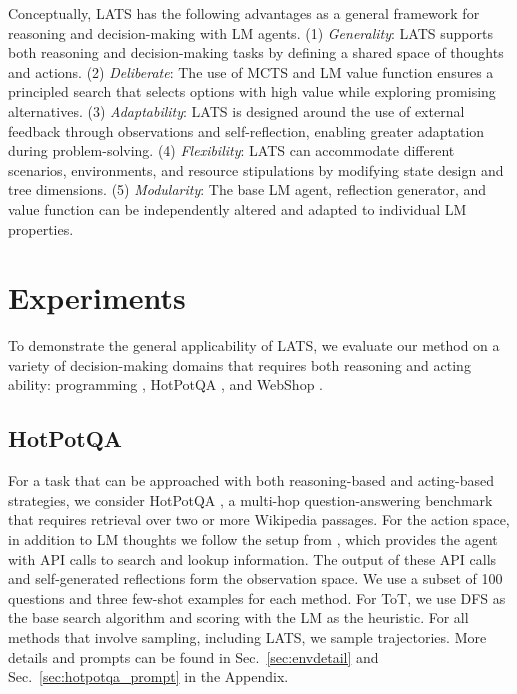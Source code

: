 \documentclass{article} \usepackage{iclr2024_conference,times}
\begin{document}
Conceptually, LATS has the following advantages as a general framework for reasoning and decision-making with LM agents.
(1) \textit{Generality}: LATS supports both reasoning and decision-making tasks by defining a shared space of thoughts and actions. (2) \textit{Deliberate}: The use of MCTS and LM value function ensures a principled search that selects options with high value while exploring promising alternatives. (3) \textit{Adaptability}: LATS is designed around the use of external feedback through observations and self-reflection, enabling greater adaptation during problem-solving. (4) \textit{Flexibility}: LATS can accommodate different scenarios, environments, and resource stipulations by modifying state design and tree dimensions. (5) \textit{Modularity}: The base LM agent, reflection generator, and value function can be independently altered and adapted to individual LM properties.

\section{Experiments}

To demonstrate the general applicability of LATS, we evaluate our method on a variety of decision-making domains that requires both reasoning and acting ability: programming \citep{chen2021evaluating, austin2021program}, HotPotQA \citep{yang2018hotpotqa}, and WebShop \citep{yao2022webshop}.

\subsection{HotPotQA}

For a task that can be approached with both reasoning-based and acting-based strategies, we consider HotPotQA \citep{yang2018hotpotqa}, a multi-hop question-answering benchmark that requires retrieval over two or more Wikipedia passages. For the action space, in addition to LM thoughts we follow the setup from \citet{yao2023react}, which provides the agent with API calls to search and lookup information. The output of these API calls and self-generated reflections form the observation space. We use a subset of 100 questions and three few-shot examples for each method. For ToT, we use DFS as the base search algorithm and scoring with the LM as the heuristic. For all methods that involve sampling, including LATS, we sample  trajectories. More details and prompts can be found in Sec.~\ref{sec:envdetail} and Sec.~\ref{sec:hotpotqa_prompt} in the Appendix.
\end{document}
